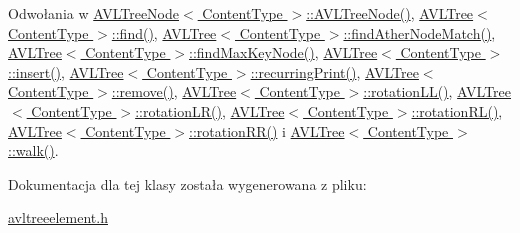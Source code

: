 Odwołania w \hyperlink{avltreeelement_8h_source_l00027}{A\-V\-L\-Tree\-Node$<$ Content\-Type $>$\-::\-A\-V\-L\-Tree\-Node()}, \hyperlink{avltree_8h_source_l00229}{A\-V\-L\-Tree$<$ Content\-Type $>$\-::find()}, \hyperlink{avltree_8h_source_l00253}{A\-V\-L\-Tree$<$ Content\-Type $>$\-::find\-Ather\-Node\-Match()}, \hyperlink{avltree_8h_source_l00244}{A\-V\-L\-Tree$<$ Content\-Type $>$\-::find\-Max\-Key\-Node()}, \hyperlink{avltree_8h_source_l00040}{A\-V\-L\-Tree$<$ Content\-Type $>$\-::insert()}, \hyperlink{avltree_8h_source_l00364}{A\-V\-L\-Tree$<$ Content\-Type $>$\-::recurring\-Print()}, \hyperlink{avltree_8h_source_l00271}{A\-V\-L\-Tree$<$ Content\-Type $>$\-::remove()}, \hyperlink{avltree_8h_source_l00151}{A\-V\-L\-Tree$<$ Content\-Type $>$\-::rotation\-L\-L()}, \hyperlink{avltree_8h_source_l00201}{A\-V\-L\-Tree$<$ Content\-Type $>$\-::rotation\-L\-R()}, \hyperlink{avltree_8h_source_l00177}{A\-V\-L\-Tree$<$ Content\-Type $>$\-::rotation\-R\-L()}, \hyperlink{avltree_8h_source_l00125}{A\-V\-L\-Tree$<$ Content\-Type $>$\-::rotation\-R\-R()} i \hyperlink{avltree_8h_source_l00370}{A\-V\-L\-Tree$<$ Content\-Type $>$\-::walk()}.



Dokumentacja dla tej klasy została wygenerowana z pliku\-:\begin{DoxyCompactItemize}
\item 
\hyperlink{avltreeelement_8h}{avltreeelement.\-h}\end{DoxyCompactItemize}
